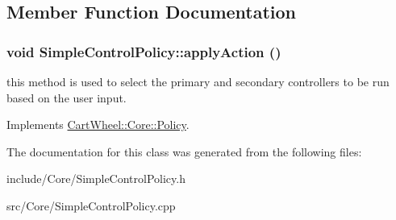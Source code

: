 \subsection{Member Function Documentation}
\hypertarget{classCartWheel_1_1Core_1_1SimpleControlPolicy_a29c91dcd0c95be19588a4d93412f3c3a}{
\subsubsection[{applyAction}]{\setlength{\rightskip}{0pt plus 5cm}void SimpleControlPolicy::applyAction ()}}
\label{classCartWheel_1_1Core_1_1SimpleControlPolicy_a29c91dcd0c95be19588a4d93412f3c3a}
this method is used to select the primary and secondary controllers to be run based on the user input. 

Implements \hyperlink{classCartWheel_1_1Core_1_1Policy_acccd1ec26392309eff12c565ae9fb8c7}{CartWheel::Core::Policy}.



The documentation for this class was generated from the following files:\begin{DoxyCompactItemize}
\item 
include/Core/SimpleControlPolicy.h\item 
src/Core/SimpleControlPolicy.cpp\end{DoxyCompactItemize}
